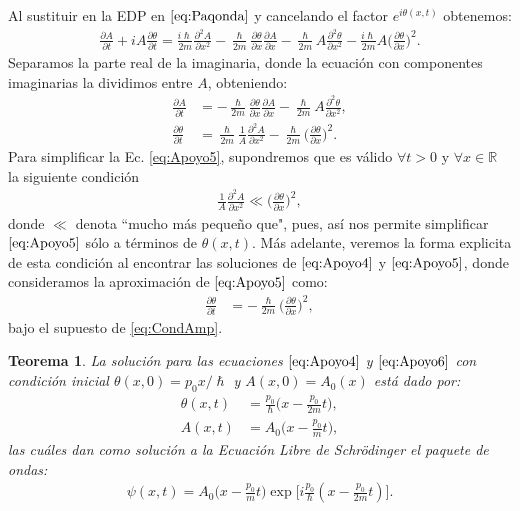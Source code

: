\documentclass[12pt]{article}
\newtheorem{teo}{Teorema}[section]
\theoremstyle{definition}
\newcommand*{\field}[1]{\mathbb{#1}}
\begin{document}
Al sustituir en la EDP en $\eqref{eq:Paqonda}$ y cancelando  el factor $e^{i\theta(x,t)}$ obtenemos:
\begin{align*}
    \frac{\partial A}{\partial t} + iA\frac{\partial\theta}{\partial t} = \frac{i\hslash}{2m}
    \frac{\partial^2 A}{\partial x^2} -\frac{\hslash}{2m}\frac{\partial\theta}{\partial x}\frac{\partial A}{\partial x} - \frac{\hslash}{2m}A\frac{\partial^2 \theta}{\partial x^2} - \frac{i\hslash}{2m}A\bigg( \frac{\partial\theta}{\partial x}\bigg) ^2.
\end{align*}
Separamos la parte real de la imaginaria, donde la ecuación con componentes imaginarias la dividimos entre $A$, obteniendo:
\begin{align}
    \frac{\partial A}{\partial t} & =
    -\frac{\hslash}{2m}\frac{\partial\theta}{\partial x}\frac{\partial A}{\partial x} - \frac{\hslash}{2m}A\frac{\partial^2 \theta}{\partial x^2},
    \label{eq:Apoyo4}
    \\
    \frac{\partial\theta}{\partial t} & = 
    \frac{\hslash}{2m}\frac{1}{A}
    \frac{\partial^2 A}{\partial x^2} - \frac{\hslash}{2m}\bigg(\frac{\partial\theta}{\partial x}\bigg)^2.
    \label{eq:Apoyo5}
\end{align}
\noindent
  Para simplificar la Ec. \eqref{eq:Apoyo5}, supondremos que es válido $\forall t>0$ y $\forall x\in\field{R}$ la siguiente condición
\begin{align}
    \frac{1}{A}\frac{\partial^2 A}{\partial x^2} \ll \bigg(\frac{\partial\theta}{\partial x}\bigg)^2,
    \label{eq:CondAmp}
\end{align}
donde $\ll$ denota ``mucho más pequeño que", pues, así nos permite simplificar $\eqref{eq:Apoyo5}$ sólo a términos de $\theta(x,t)$. Más adelante, veremos la forma explicita de esta condición al encontrar las soluciones de $\eqref{eq:Apoyo4}$ y $\eqref{eq:Apoyo5}$,
  donde consideramos la aproximación de $\eqref{eq:Apoyo5}$ como:
\begin{align}
    \frac{\partial\theta}{\partial t} & = 
    - \frac{\hslash}{2m}\bigg(\frac{\partial\theta}{\partial x}\bigg)^2,
    \label{eq:Apoyo6}
\end{align}
bajo el supuesto de \eqref{eq:CondAmp}.
\begin{teo}
    La solución para las ecuaciones $\eqref{eq:Apoyo4}$ y $\eqref{eq:Apoyo6}$ con condición inicial $\theta(x,0) = p_{0}x/\hslash$ y $A(x,0) = A_{0}(x)$ está dado por:
    \begin{align*}
        \theta(x,t) & = \frac{p_{0}}{\hslash}\bigg(x - \frac{p_{0}}{2m}t\bigg),
        \\
        A(x,t) & = A_{0}\bigg(x-\frac{p_{0}}{m}t\bigg),
    \end{align*}
    las cuáles dan como solución a la Ecuación Libre de Schrödinger el paquete de ondas:
    \begin{align}
        \psi(x,t) = A_{0}\bigg(x-\frac{p_{0}}{m}t\bigg)\exp\bigg[i\frac{p_{0}}{\hslash}(x - \frac{p_{0}}{2m}t)\bigg].
        \label{eq:Apoyo7}
    \end{align}
\end{teo}
\end{document}
